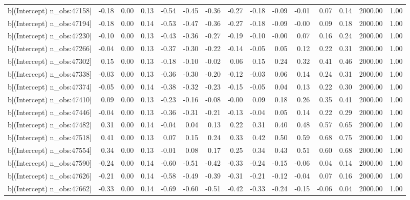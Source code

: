 \begin{table}[ht]
\begin{tabular}{rrrrrrrrrrrrrrr}
  b[(Intercept) n\_obs:47158] & -0.18 & 0.00 & 0.13 & -0.54 & -0.45 & -0.36 & -0.27 & -0.18 & -0.09 & -0.01 & 0.07 & 0.14 & 2000.00 & 1.00 \\ 
  b[(Intercept) n\_obs:47194] & -0.18 & 0.00 & 0.14 & -0.53 & -0.47 & -0.36 & -0.27 & -0.18 & -0.09 & -0.00 & 0.09 & 0.18 & 2000.00 & 1.00 \\ 
  b[(Intercept) n\_obs:47230] & -0.10 & 0.00 & 0.13 & -0.43 & -0.36 & -0.27 & -0.19 & -0.10 & -0.00 & 0.07 & 0.16 & 0.24 & 2000.00 & 1.00 \\ 
  b[(Intercept) n\_obs:47266] & -0.04 & 0.00 & 0.13 & -0.37 & -0.30 & -0.22 & -0.14 & -0.05 & 0.05 & 0.12 & 0.22 & 0.31 & 2000.00 & 1.00 \\ 
  b[(Intercept) n\_obs:47302] & 0.15 & 0.00 & 0.13 & -0.18 & -0.10 & -0.02 & 0.06 & 0.15 & 0.24 & 0.32 & 0.41 & 0.46 & 2000.00 & 1.00 \\ 
  b[(Intercept) n\_obs:47338] & -0.03 & 0.00 & 0.13 & -0.36 & -0.30 & -0.20 & -0.12 & -0.03 & 0.06 & 0.14 & 0.24 & 0.31 & 2000.00 & 1.00 \\ 
  b[(Intercept) n\_obs:47374] & -0.05 & 0.00 & 0.14 & -0.38 & -0.32 & -0.23 & -0.15 & -0.05 & 0.04 & 0.13 & 0.22 & 0.30 & 2000.00 & 1.00 \\ 
  b[(Intercept) n\_obs:47410] & 0.09 & 0.00 & 0.13 & -0.23 & -0.16 & -0.08 & -0.00 & 0.09 & 0.18 & 0.26 & 0.35 & 0.41 & 2000.00 & 1.00 \\ 
  b[(Intercept) n\_obs:47446] & -0.04 & 0.00 & 0.13 & -0.36 & -0.31 & -0.21 & -0.13 & -0.04 & 0.05 & 0.14 & 0.22 & 0.29 & 2000.00 & 1.00 \\ 
  b[(Intercept) n\_obs:47482] & 0.31 & 0.00 & 0.14 & -0.04 & 0.04 & 0.13 & 0.22 & 0.31 & 0.40 & 0.48 & 0.57 & 0.65 & 2000.00 & 1.00 \\ 
  b[(Intercept) n\_obs:47518] & 0.41 & 0.00 & 0.13 & 0.07 & 0.15 & 0.24 & 0.33 & 0.42 & 0.50 & 0.59 & 0.68 & 0.75 & 2000.00 & 1.00 \\ 
  b[(Intercept) n\_obs:47554] & 0.34 & 0.00 & 0.13 & -0.01 & 0.08 & 0.17 & 0.25 & 0.34 & 0.43 & 0.51 & 0.60 & 0.68 & 2000.00 & 1.00 \\ 
  b[(Intercept) n\_obs:47590] & -0.24 & 0.00 & 0.14 & -0.60 & -0.51 & -0.42 & -0.33 & -0.24 & -0.15 & -0.06 & 0.04 & 0.14 & 2000.00 & 1.00 \\ 
  b[(Intercept) n\_obs:47626] & -0.21 & 0.00 & 0.14 & -0.58 & -0.49 & -0.39 & -0.31 & -0.21 & -0.12 & -0.04 & 0.07 & 0.16 & 2000.00 & 1.00 \\ 
  b[(Intercept) n\_obs:47662] & -0.33 & 0.00 & 0.14 & -0.69 & -0.60 & -0.51 & -0.42 & -0.33 & -0.24 & -0.15 & -0.06 & 0.04 & 2000.00 & 1.00 \\ 

\end{tabular}
\end{table}
